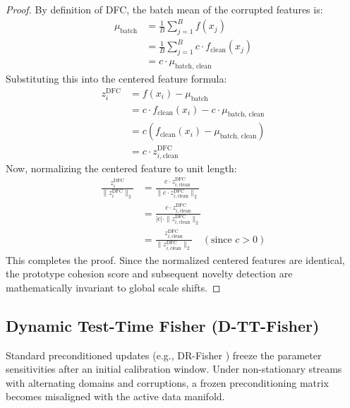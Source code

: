 \documentclass{article}
\theoremstyle{plain}
\theoremstyle{definition}
\theoremstyle{remark}
\begin{document}
\begin{proof}
By definition of DFC, the batch mean of the corrupted features is:
\begin{align}
  \mu_{\text{batch}} &= \frac{1}{B} \sum_{j=1}^B f(x_j) \nonumber \\
  &= \frac{1}{B} \sum_{j=1}^B c \cdot f_{\text{clean}}(x_j) \nonumber \\
  &= c \cdot \mu_{\text{batch, clean}}
\end{align}
Substituting this into the centered feature formula:
\begin{align}
  z_i^{\text{DFC}} &= f(x_i) - \mu_{\text{batch}} \nonumber \\
  &= c \cdot f_{\text{clean}}(x_i) - c \cdot \mu_{\text{batch, clean}} \nonumber \\
  &= c \left( f_{\text{clean}}(x_i) - \mu_{\text{batch, clean}} \right) \nonumber \\
  &= c \cdot z_{i,\text{clean}}^{\text{DFC}}
\end{align}
Now, normalizing the centered feature to unit length:
\begin{align}
  \frac{z_i^{\text{DFC}}}{\|z_i^{\text{DFC}}\|_2} &= \frac{c \cdot z_{i,\text{clean}}^{\text{DFC}}}{\|c \cdot z_{i,\text{clean}}^{\text{DFC}}\|_2} \nonumber \\
  &= \frac{c \cdot z_{i,\text{clean}}^{\text{DFC}}}{|c| \cdot \|z_{i,\text{clean}}^{\text{DFC}}\|_2} \nonumber \\
  &= \frac{z_{i,\text{clean}}^{\text{DFC}}}{\|z_{i,\text{clean}}^{\text{DFC}}\|_2} \quad (\text{since } c > 0)
\end{align}
This completes the proof. Since the normalized centered features are identical, the prototype cohesion score and subsequent novelty detection are mathematically invariant to global scale shifts.
\end{proof}

\subsection{Dynamic Test-Time Fisher (D-TT-Fisher)}
Standard preconditioned updates (e.g., DR-Fisher \cite{dr_fisher}) freeze the parameter sensitivities after an initial calibration window. Under non-stationary streams with alternating domains and corruptions, a frozen preconditioning matrix becomes misaligned with the active data manifold. 
\end{document}
